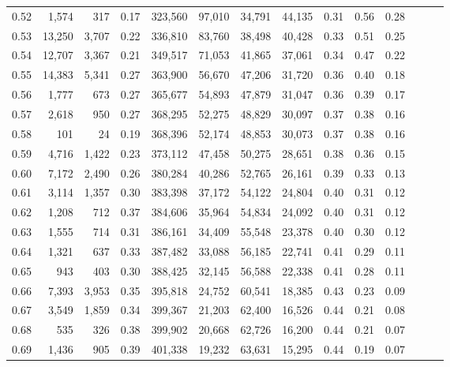 \begin{tabular}{rrrrrrrrrrrrrr}
0.52 &   1,574 &    317 &  0.17 &  323,560 &   97,010 &  34,791 &  44,135 &  0.31 &  0.56 &      0.28 \\
0.53 &  13,250 &  3,707 &  0.22 &  336,810 &   83,760 &  38,498 &  40,428 &  0.33 &  0.51 &      0.25 \\
0.54 &  12,707 &  3,367 &  0.21 &  349,517 &   71,053 &  41,865 &  37,061 &  0.34 &  0.47 &      0.22 \\
0.55 &  14,383 &  5,341 &  0.27 &  363,900 &   56,670 &  47,206 &  31,720 &  0.36 &  0.40 &      0.18 \\
0.56 &   1,777 &    673 &  0.27 &  365,677 &   54,893 &  47,879 &  31,047 &  0.36 &  0.39 &      0.17 \\
0.57 &   2,618 &    950 &  0.27 &  368,295 &   52,275 &  48,829 &  30,097 &  0.37 &  0.38 &      0.16 \\
0.58 &     101 &     24 &  0.19 &  368,396 &   52,174 &  48,853 &  30,073 &  0.37 &  0.38 &      0.16 \\
0.59 &   4,716 &  1,422 &  0.23 &  373,112 &   47,458 &  50,275 &  28,651 &  0.38 &  0.36 &      0.15 \\
0.60 &   7,172 &  2,490 &  0.26 &  380,284 &   40,286 &  52,765 &  26,161 &  0.39 &  0.33 &      0.13 \\
0.61 &   3,114 &  1,357 &  0.30 &  383,398 &   37,172 &  54,122 &  24,804 &  0.40 &  0.31 &      0.12 \\
0.62 &   1,208 &    712 &  0.37 &  384,606 &   35,964 &  54,834 &  24,092 &  0.40 &  0.31 &      0.12 \\
0.63 &   1,555 &    714 &  0.31 &  386,161 &   34,409 &  55,548 &  23,378 &  0.40 &  0.30 &      0.12 \\
0.64 &   1,321 &    637 &  0.33 &  387,482 &   33,088 &  56,185 &  22,741 &  0.41 &  0.29 &      0.11 \\
0.65 &     943 &    403 &  0.30 &  388,425 &   32,145 &  56,588 &  22,338 &  0.41 &  0.28 &      0.11 \\
0.66 &   7,393 &  3,953 &  0.35 &  395,818 &   24,752 &  60,541 &  18,385 &  0.43 &  0.23 &      0.09 \\
0.67 &   3,549 &  1,859 &  0.34 &  399,367 &   21,203 &  62,400 &  16,526 &  0.44 &  0.21 &      0.08 \\
0.68 &     535 &    326 &  0.38 &  399,902 &   20,668 &  62,726 &  16,200 &  0.44 &  0.21 &      0.07 \\
0.69 &   1,436 &    905 &  0.39 &  401,338 &   19,232 &  63,631 &  15,295 &  0.44 &  0.19 &      0.07 \\

\end{tabular}
